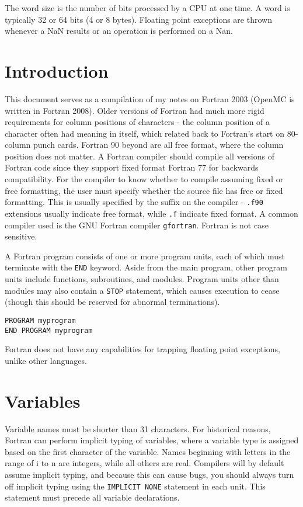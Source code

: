 \documentclass[10pt]{article}
\begin{document}
The word size is the number of bits processed by a CPU at one time. A word is typically 32 or 64 bits (4 or 8 bytes). Floating point exceptions are thrown whenever a NaN results or an operation is performed on a Nan. 

\section{Introduction}

This document serves as a compilation of my notes on Fortran 2003 (OpenMC is written in Fortran 2008). Older versions of Fortran had much more rigid requirements for column positions of characters - the column position of a character often had meaning in itself, which related back to Fortran's start on 80-column punch cards. Fortran 90 beyond are all free format, where the column position does not matter. A Fortran compiler should compile all versions of Fortran code since they support fixed format Fortran 77 for backwards compatibility. For the compiler to know whether to compile assuming fixed or free formatting, the user must specify whether the source file has free or fixed formatting. This is usually specified by the suffix on the compiler - {\tt .f90} extensions usually indicate free format, while {\tt .f} indicate fixed format. A common compiler used is the GNU Fortran compiler {\tt gfortran}. Fortran is not case sensitive.

A Fortran program consists of one or more program units, each of which must terminate with the {\tt END} keyword. Aside from the main program, other program units include functions, subroutines, and modules. Program units other than modules may also contain a {\tt STOP} statement, which causes execution to cease (though this should be reserved for abnormal terminations).  

\begin{lstlisting}
PROGRAM myprogram
END PROGRAM myprogram
\end{lstlisting}

Fortran does not have any capabilities for trapping floating point exceptions, unlike other languages. 

\section{Variables}
Variable names must be shorter than 31 characters. For historical reasons, Fortran can perform implicit typing of variables, where a variable type is assigned based on the first character of the variable. Names beginning with letters in the range of i to n are integers, while all others are real. Compilers will by default assume implicit typing, and because this can cause bugs, you should always turn off implicit typing using the {\tt IMPLICIT NONE} statement in each unit. This statement must precede all variable declarations. 
\end{document}
